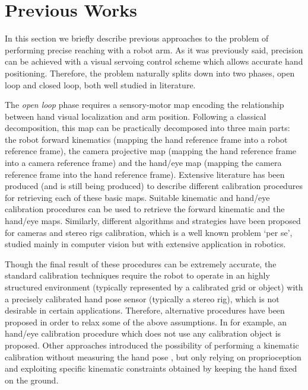 \section{Previous Works}



In this section we briefly describe previous approaches to the problem of performing precise reaching with a robot arm. As it was previously said, precision can be achieved with a visual servoing control scheme which allows accurate hand positioning. Therefore, the problem naturally splits down into two phases, open loop and closed loop, both well studied in literature.

The {\em open loop} phase requires a sensory-motor map encoding the relationship between hand visual localization and arm position. Following a classical decomposition, this map can be practically decomposed into three main parts: the robot forward kinematics (mapping the hand reference frame into a robot reference frame), the camera projective map (mapping the hand reference frame into a camera reference frame) and the hand/eye map (mapping the camera reference frame into the hand reference frame). Extensive literature has been produced (and is still being produced) to describe different calibration procedures for retrieving each of these basic maps. Suitable kinematic \cite{Hollerbach96calibration} and hand/eye \cite{Tsai88calibration} calibration procedures can be used to retrieve the forward kinematic and the hand/eye maps. Similarly, different algorithms and strategies have been proposed for cameras and stereo rigs calibration, which is a well known problem `per se', studied mainly in computer vision \cite{Soatto03vision} but with extensive application in robotics. 

Though the final result of these procedures can be extremely accurate, the standard calibration techniques require the robot to operate in an highly structured environment (typically represented by a calibrated grid or object) with a precisely calibrated hand pose sensor (typically a stereo rig), which is not desirable in certain applications. Therefore, alternative procedures have been proposed in order to relax some of the above assumptions. In \cite{AHE01} for example, an hand/eye calibration procedure which does not use any calibration object is proposed. Other approaches introduced the possibility of performing a kinematic calibration without measuring the hand pose \cite{Bennett91calibration}, but only relying on proprioception and exploiting specific kinematic constraints obtained by keeping the hand fixed on the ground. 

